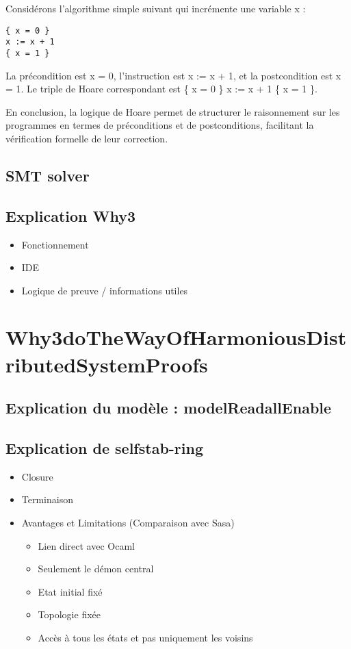 \documentclass[11pt]{article}
\begin{document}
Considérons l'algorithme simple suivant qui incrémente une variable x :

\begin{verbatim}
{ x = 0 } 
x := x + 1 
{ x = 1 }
\end{verbatim}
La précondition est x = 0, l'instruction est x := x + 1, et la postcondition est x = 1. Le triple de Hoare correspondant est \{ x = 0 \} x := x + 1 \{ x = 1 \}.

En conclusion, la logique de Hoare permet de structurer le raisonnement sur les programmes en termes de préconditions et de postconditions, facilitant la vérification formelle de leur correction.
\subsection{SMT solver}
\label{sec:org6070acb}
\subsection{Explication Why3}
\label{sec:org36863b1}
\begin{itemize}
\item Fonctionnement
\item IDE
\item Logique de preuve / informations utiles
\end{itemize}

\section{Why3doTheWayOfHarmoniousDistributedSystemProofs}
\label{sec:orgc3b2159}

\subsection{Explication du modèle : modelReadallEnable}
\label{sec:org0ff04ea}
\subsection{Explication de selfstab-ring}
\label{sec:org68d3d67}
\begin{itemize}
\item Closure
\item Terminaison
\item Avantages et Limitations (Comparaison avec Sasa)
\begin{itemize}
\item Lien direct avec Ocaml
\item Seulement le démon central
\item Etat initial fixé
\item Topologie fixée
\item Accès à tous les états et pas uniquement les voisins
\end{itemize}
\end{itemize}
\end{document}
